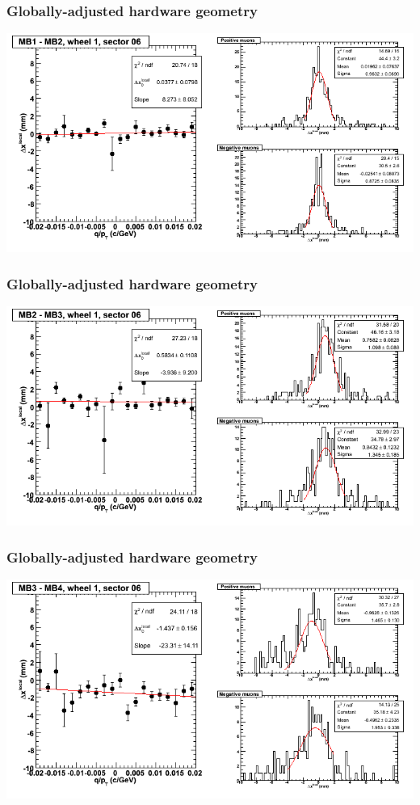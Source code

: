 \documentclass[compress]{beamer}
\begin{document}
\begin{frame}
\frametitle{Globally-adjusted hardware geometry}
\includegraphics[width=\linewidth]{NOV4_segdiffs_HW/dt13_resid_D_06_12.png}
\end{frame}

\begin{frame}
\frametitle{Globally-adjusted hardware geometry}
\includegraphics[width=\linewidth]{NOV4_segdiffs_HW/dt13_resid_D_06_23.png}
\end{frame}

\begin{frame}
\frametitle{Globally-adjusted hardware geometry}
\includegraphics[width=\linewidth]{NOV4_segdiffs_HW/dt13_resid_D_06_34.png}
\end{frame}
\end{document}
